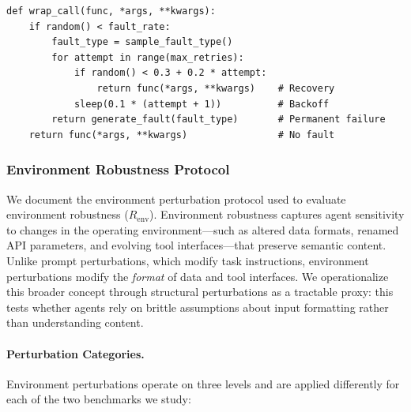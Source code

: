 \documentclass[11pt]{article}
\begin{document}
\begin{tcolorbox}[
    colback=gray!5!white,
    colframe=gray!50!black,
    title={\textbf{Fault Injection Pseudocode}},
    fonttitle=\bfseries\small,
    boxrule=0.5pt,
    arc=2pt
]
\small
\begin{verbatim}
def wrap_call(func, *args, **kwargs):
    if random() < fault_rate:
        fault_type = sample_fault_type()
        for attempt in range(max_retries):
            if random() < 0.3 + 0.2 * attempt:
                return func(*args, **kwargs)    # Recovery
            sleep(0.1 * (attempt + 1))          # Backoff
        return generate_fault(fault_type)       # Permanent failure
    return func(*args, **kwargs)                # No fault
\end{verbatim}
\end{tcolorbox}

\subsubsection{Environment Robustness Protocol}
\label{appendix:structural_perturbation}

We document the environment perturbation protocol used to evaluate environment robustness ($R_{\text{env}}$). Environment robustness captures agent sensitivity to changes in the operating environment---such as altered data formats, renamed API parameters, and evolving tool interfaces---that preserve semantic content. Unlike prompt perturbations, which modify task instructions, environment perturbations modify the \emph{format} of data and tool interfaces. We operationalize this broader concept through structural perturbations as a tractable proxy: this tests whether agents rely on brittle assumptions about input formatting rather than understanding content.

\paragraph{Perturbation Categories.}

Environment perturbations operate on three levels and are applied differently for each of the two benchmarks we study:
\end{document}
